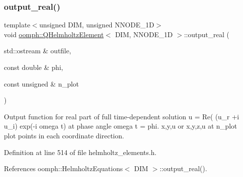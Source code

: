 \mbox{\label{classoomph_1_1QHelmholtzElement_a60e27818eabd8a5ebf9328a97b89b2b3}} 
\subsubsection{\texorpdfstring{output\+\_\+real()}{output\_real()}}
{\footnotesize\ttfamily template$<$unsigned D\+IM, unsigned N\+N\+O\+D\+E\+\_\+1D$>$ \\
void \hyperlink{classoomph_1_1QHelmholtzElement}{oomph\+::\+Q\+Helmholtz\+Element}$<$ D\+IM, N\+N\+O\+D\+E\+\_\+1D $>$\+::output\+\_\+real (\begin{DoxyParamCaption}\item[{std\+::ostream \&}]{outfile,  }\item[{const double \&}]{phi,  }\item[{const unsigned \&}]{n\+\_\+plot }\end{DoxyParamCaption})\hspace{0.3cm}{\ttfamily [inline]}}



Output function for real part of full time-\/dependent solution u = Re( (u\+\_\+r +i u\+\_\+i) exp(-\/i omega t) at phase angle omega t = phi. x,y,u or x,y,z,u at n\+\_\+plot plot points in each coordinate direction. 



Definition at line 514 of file helmholtz\+\_\+elements.\+h.



References oomph\+::\+Helmholtz\+Equations$<$ D\+I\+M $>$\+::output\+\_\+real().

\mbox{\label{classoomph_1_1QHelmholtzElement_a91d895b690a27d2a3cffb7ebb6b7c8f8}} 
